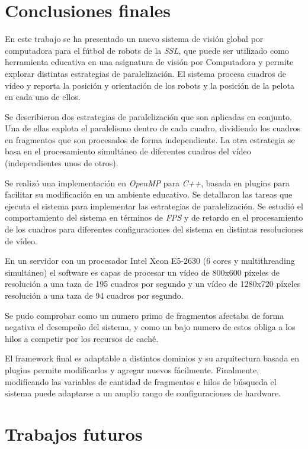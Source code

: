 
\section{Conclusiones finales}

En este trabajo se ha presentado un nuevo sistema de visión global por
computadora para el fútbol de robots de la \emph{SSL}, que puede ser utilizado
como herramienta educativa en una asignatura de visión por Computadora y permite
explorar distintas estrategias de paralelización. El sistema procesa cuadros de
vídeo y reporta la posición y orientación de los robots y la posición de la
pelota en cada uno de ellos.

Se describieron dos estrategias de paralelización que son aplicadas en conjunto.
Una de ellas explota el paralelismo dentro de cada cuadro, dividiendo los
cuadros en fragmentos que son procesados de forma independiente. La otra
estrategia se basa en el procesamiento simultáneo de diferentes cuadros del
vídeo (independientes unos de otros).

Se realizó una implementación en \emph{OpenMP} para \emph{C++}, basada en
plugins para facilitar su modificación en un ambiente educativo. Se detallaron
las tareas que ejecuta el sistema para implementar las estrategias de
paralelización. Se estudió el comportamiento del sistema en términos de
\emph{FPS} y de retardo en el procesamiento de los cuadros para diferentes
configuraciones del sistema en distintas resoluciones de vídeo.

En un servidor con un procesador Intel Xeon E5-2630 (6 cores y multithreading
simultáneo) el software es capas de procesar un vídeo de 800x600 píxeles de
resolución a una taza de 195 cuadros por segundo y un vídeo de 1280x720 píxeles
resolución a una taza de 94 cuadros por segundo.

Se pudo comprobar como un numero primo de fragmentos afectaba de forma negativa
el desempeño del sistema, y como un bajo numero de estos obliga a los hilos a
competir por los recursos de caché.

El framework final es adaptable a distintos dominios y su arquitectura basada en
plugins permite modificarlos y agregar nuevos fácilmente. Finalmente,
modificando las variables de cantidad de fragmentos e hilos de búsqueda el
sistema puede adaptarse a un amplio rango de configuraciones de hardware.

\section{Trabajos futuros}

